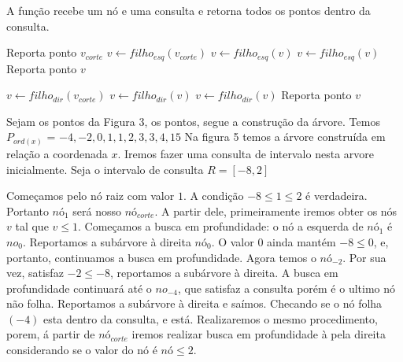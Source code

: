 \begin{algorithm}[H]
    \caption{A função  recebe um nó e uma consulta e retorna todos
    os pontos dentro da consulta.}
    \begin{algorithmic}[1]
                \State Reporta ponto $v_{corte}$
            \EndIf
        \Else
            \State $v \leftarrow filho_{esq}(v_{corte})$
                    \State {}
                    \State $v \leftarrow filho_{esq}(v)$
                \Else
                    \State $v \leftarrow filho_{esq}(v)$
                \EndIf
            \EndWhile
                \State Reporta ponto $v$
            \EndIf


            \State $v \leftarrow filho_{dir}(v_{corte})$
                    \State {}
                    \State $v \leftarrow filho_{dir}(v)$
                \Else
                    \State $v \leftarrow filho_{dir}(v)$
                \EndIf
            \EndWhile
                \State Reporta ponto $v$
            \EndIf
        \Endif
    \EndFunction
    \end{algorithmic}
\end{algorithm}
\clearpage


Sejam os pontos da Figura 3, os pontos, segue a construção da árvore.
Temos $P_{ord(x)}$ = $-4, -2, 0, 1, 1, 2, 3, 3, 4, 15$
Na figura 5 temos a árvore construída em relação a coordenada $x$.
Iremos fazer uma consulta de intervalo nesta arvore inicialmente.
Seja o intervalo de consulta $R = [-8, 2]$


Começamos pelo nó raiz com valor $1$. A condição $-8 \leq 1 \leq 2$ é verdadeira. Portanto $nó_{1}$
será nosso $nó_{corte}$.
A partir dele, primeiramente iremos obter os nós $v$ tal que $v \leq 1$. Começamos a busca em profundidade:
o nó a esquerda de $nó_{1}$ é $no_{0}$. Reportamos a subárvore à direita $nó_{0}$.
O valor $0$ ainda mantém $-8 \leq 0$, e, portanto, continuamos a busca em profundidade. 
Agora temos o $nó_{-2}$. Por sua vez, satisfaz  $-2 \leq -8$, reportamos a subárvore à direita. A busca
em profundidade continuará até o $no_{-4}$, que satisfaz a consulta porém é o ultimo nó não folha. Reportamos
a subárvore à direita e saímos. Checando se o nó folha $(-4)$ esta dentro da consulta, e está.
Realizaremos o mesmo procedimento, porem, á partir de $nó_{corte}$ iremos realizar busca em profundidade
à pela direita considerando se o valor do nó é $nó \leq 2$.

